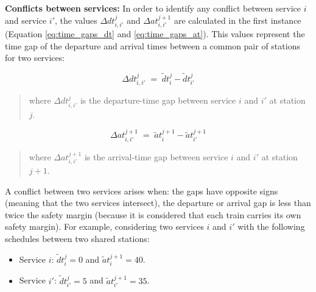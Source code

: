\documentclass[Afour,sagev,times]{sagej}
\begin{document}
\textbf{Conflicts between services: } In order to identify any conflict between service $ i $ and service $ i' $, the values $ \Delta dt_{i,i'}^{j} $ and $ \Delta at_{i,i'}^{j+1} $ are calculated in the first instance (Equation \ref{eq:time_gaps_dt} and \ref{eq:time_gaps_at}). This values represent the time gap of the departure and arrival times between a common pair of stations for two services:


\begin{equation}
\Delta dt_{i,i'}^{j} \;=\; \tilde dt_{i}^{j} - \tilde dt_{i'}^{j}
\label{eq:time_gaps_dt}
\end{equation}

\begin{quote}
where $\Delta dt_{i,i'}^{j}$ is the departure‐time gap between service $i$ and $i'$ at station $j$.
\end{quote}


\begin{equation}
\Delta at_{i,i'}^{j+1} \;=\; \tilde at_{i}^{j+1} - \tilde at_{i'}^{j+1}
\label{eq:time_gaps_at}
\end{equation}

\begin{quote}
where $\Delta at_{i,i'}^{j+1}$ is the arrival‐time gap between service $i$ and $i'$ at station $j+1$.
\end{quote}

A conflict between two services arises when: the gaps have opposite signs (meaning that the two services intersect), the departure or arrival gap is less than twice the safety margin (because it is considered that each train carries its own safety margin). For example, considering two services $ i $ and $ i' $ with the following schedules between two shared stations:

\begin{itemize}
    \item Service $ i $: $ \tilde dt_{i}^{j} = 0 $ and $ \tilde at_{i}^{j+1} = 40 $.
    \item Service $ i' $: $ \tilde dt_{i'}^{j} = 5 $ and $ \tilde at_{i'}^{j+1} = 35 $.
\end{itemize}
\end{document}
